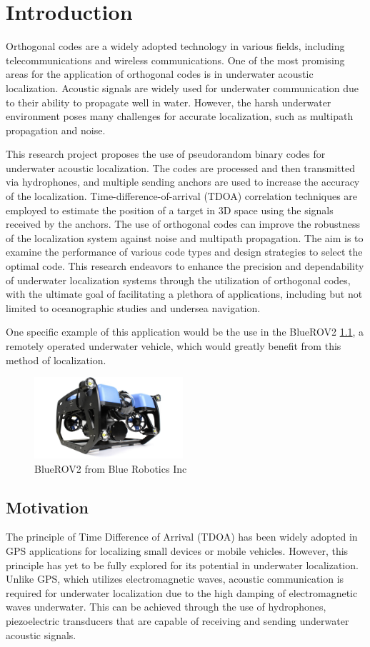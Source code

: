 \chapter{Introduction}
Orthogonal codes are a widely adopted technology in various fields, including telecommunications and wireless communications. One of the most promising areas for the application of orthogonal codes is in underwater acoustic localization. Acoustic signals are widely used for underwater communication due to their ability to propagate well in water. However, the harsh underwater environment poses many challenges for accurate localization, such as multipath propagation and noise.

This research project proposes the use of pseudorandom binary codes for underwater acoustic localization. The codes are processed and then transmitted via hydrophones, and multiple sending anchors are used to increase the accuracy of the localization. Time-difference-of-arrival (TDOA) correlation techniques are employed to estimate the position of a target in 3D space using the signals received by the anchors. The use of orthogonal codes can improve the robustness of the localization system against noise and multipath propagation. The aim is to examine the performance of various code types and design strategies to select the optimal code. This research endeavors to enhance the precision and dependability of underwater localization systems through the utilization of orthogonal codes, with the ultimate goal of facilitating a plethora of applications, including but not limited to oceanographic studies and undersea navigation. 

One specific example of this application would be the use in the BlueROV2 \ref{fig:bluerov}, a remotely operated underwater vehicle, which would greatly benefit from  this method of localization.

\begin{figure}[h]
	\centering
	\includegraphics[width=5.5cm]{images/bluerov}
	
	\caption{BlueROV2 from Blue Robotics Inc}
	\label{fig:bluerov}
\end{figure}
\section{Motivation} 
The principle of Time Difference of Arrival (TDOA) has been widely adopted in GPS applications for localizing small devices or mobile vehicles. However, this principle has yet to be fully explored for its potential in underwater localization. Unlike GPS, which utilizes electromagnetic waves, acoustic communication is required for underwater localization due to the high damping of electromagnetic waves underwater. This can be achieved through the use of hydrophones, piezoelectric transducers that are capable of receiving and sending underwater acoustic signals.

